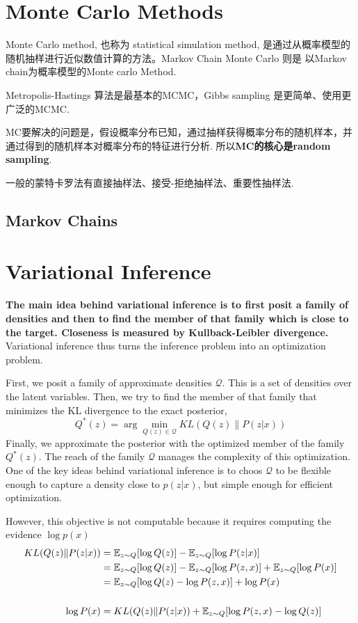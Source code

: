 \section{Monte Carlo Methods}
Monte Carlo method, 也称为 statistical simulation method, 是通过从概率模型的随机抽样进行近似数值计算的方法。Markov Chain Monte Carlo 则是
以Markov chain为概率模型的Monte carlo Method.

Metropolis-Hastings 算法是最基本的MCMC，Gibbs sampling 是更简单、使用更广泛的MCMC.

MC要解决的问题是，假设概率分布已知，通过抽样获得概率分布的随机样本，并通过得到的随机样本对概率分布的特征进行分析. 所以\textbf{MC的核心是random sampling}.

一般的蒙特卡罗法有直接抽样法、接受-拒绝抽样法、重要性抽样法. \cite{lihang2019}

\subsection{Markov Chains}

\section{Variational Inference}

\textbf{The main idea behind variational inference is to first posit a family of densities and then to find the member of that family which is close to
the target. Closeness is measured by Kullback-Leibler divergence.} Variational inference thus turns the
inference problem into an optimization problem.

First, we posit a family of approximate densities $\mathcal{Q}$. This is a set of densities over the latent
variables. Then, we try to find the member of that family that minimizes the KL divergence to the exact posterior,
\begin{equation}
    Q^*(z) = \arg \min_{Q(z) \in \mathcal{Q}} KL(Q(z)\|P(z|x))
\end{equation}
Finally, we approximate the posterior with the optimized member of the family $Q^*(z)$. The reach of the family $\mathcal{Q}$ manages the complexity of this
optimization. One of the key ideas behind variational inference is to choos $\mathcal{Q}$ to be flexible enough to capture a density close to $p(z|x)$, but
simple enough for efficient optimization.

However, this objective is not computable because it requires computing the evidence $\log p(x)$
\begin{equation}
    \begin{split}
        KL(Q(z)\|P(z|x))
        &= \mathbb{E}_{z \sim Q} [\log Q(z)] - \mathbb{E}_{z \sim Q} [\log P(z|x)] \\
        &= \mathbb{E}_{z \sim Q} [\log Q(z)] - \mathbb{E}_{z \sim Q} [\log P(z, x)] + \mathbb{E}_{z \sim Q}[\log P(x)]\\
        &= \mathbb{E}_{z \sim Q} [\log Q(z) - \log P(z, x)] + \log P(x) \\
        \\
        \log P(x)
        &= KL(Q(z)\|P(z|x)) + \mathbb{E}_{z \sim Q} [\log P(z, x) - \log Q(z)]
    \end{split}
\end{equation}

